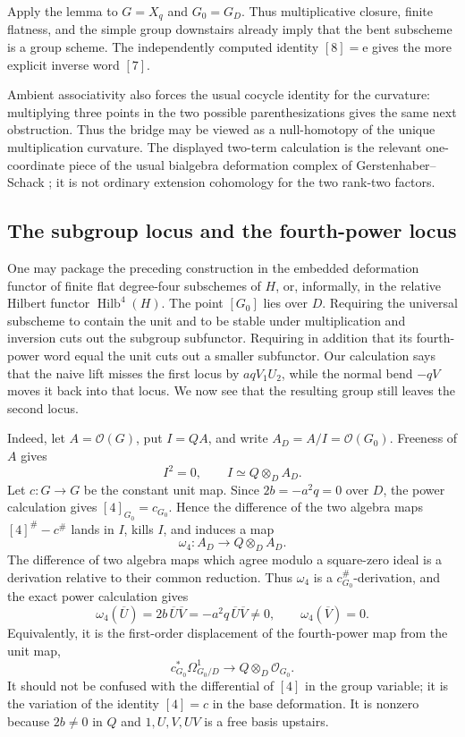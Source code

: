 \documentclass[11pt]{amsart}
\theoremstyle{definition}
\theoremstyle{remark}
\newcommand{\ot}{\otimes}
\newcommand{\unit}{\mathrm e}
\begin{document}
Apply the lemma to \(G=X_q\) and \(G_0=G_D\).  Thus multiplicative
closure, finite flatness, and the simple group downstairs already imply
that the bent subscheme is a group scheme.  The independently computed
identity \([8]=\unit\) gives the more explicit inverse word \([7]\).

Ambient associativity also forces the usual cocycle identity for the
curvature: multiplying three points in the two possible parenthesizations
gives the same next obstruction.  Thus the bridge may be viewed as a
null-homotopy of the unique multiplication curvature.  The displayed
two-term calculation is the relevant one-coordinate piece of the usual
bialgebra deformation complex of Gerstenhaber--Schack
\cite{GerstenhaberSchack}; it is not ordinary extension cohomology for
the two rank-two factors.

\subsection{The subgroup locus and the fourth-power locus}

One may package the preceding construction in the embedded deformation
functor of finite flat degree-four subschemes of \(H\), or, informally,
in the relative Hilbert functor \(\operatorname{Hilb}^4(H)\).  The point
\([G_0]\) lies over \(D\).  Requiring the universal subscheme to contain
the unit and to be stable under multiplication and inversion cuts out
the subgroup subfunctor.  Requiring in addition that its fourth-power
word equal the unit cuts out a smaller subfunctor.  Our calculation says
that the naive lift misses the first locus by \(aqV_1U_2\), while the
normal bend \(-qV\) moves it back into that locus.  We now see that the
resulting group still leaves the second locus.

Indeed, let \(A=\mathcal O(G)\), put \(I=QA\), and write
\(A_D=A/I=\mathcal O(G_0)\).  Freeness of \(A\) gives
\[
 I^2=0,\qquad I\simeq Q\ot_DA_D.
\]
Let \(c:G\to G\) be the constant unit map.  Since
\(2b=-a^2q=0\) over \(D\), the power calculation gives
\([4]_{G_0}=c_{G_0}\).  Hence the difference of the two algebra maps
\([4]^\#-c^\#\) lands in \(I\), kills \(I\), and induces a map
\[
 \omega_4:A_D\longrightarrow Q\ot_DA_D.
\]
The difference of two algebra maps which agree modulo a square-zero ideal
is a derivation relative to their common reduction.  Thus \(\omega_4\)
is a \(c_{G_0}^\#\)-derivation, and the exact power calculation gives
\begin{equation}\label{eq:first-order-word-defect}
 \omega_4(\overline U)
   =2b\,\overline U\overline V
   =-a^2q\,\overline U\overline V\ne0,
 \qquad
 \omega_4(\overline V)=0.
\end{equation}
Equivalently, it is the first-order displacement of the fourth-power map
from the unit map,
\[
 c_{G_0}^*\Omega^1_{G_0/D}
 \longrightarrow Q\ot_D\mathcal O_{G_0}.
\]
It should not be confused with the differential of \([4]\) in the group
variable; it is the variation of the identity \([4]=c\) in the base
deformation.  It is nonzero because \(2b\ne0\) in \(Q\) and
\(1,U,V,UV\) is a free basis upstairs.
\end{document}
